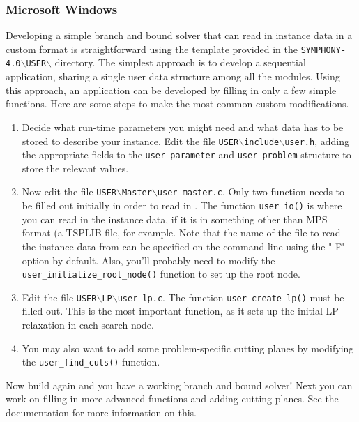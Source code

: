 \subsubsection{Microsoft Windows}
Developing a simple branch and bound solver that can read in instance data in
a custom format is straightforward using the template provided in the
\texttt{SYMPHONY-4.0$\backslash$USER$\backslash$} directory. The simplest approach is to develop a
sequential application, sharing a single user data structure among all the
modules. Using this approach, an application can be developed by filling in
only a few simple functions. Here are some steps to make the most common
custom modifications.

\begin{enumerate}

\item Decide what run-time parameters you might need and what data has 
to be stored to describe your instance. Edit the file
\texttt{USER$\backslash$include$\backslash$user.h}, adding the appropriate
fields to the \texttt{user\_parameter} and \texttt{user\_problem} structure to
store the relevant values.

\item Now edit the file
\texttt{USER$\backslash$Master$\backslash$user\_master.c}. Only two
function needs to be filled out initially in order to read in . The function
\texttt{user\_io()} is where you can read in the instance data, if it is in
something other than MPS format (a TSPLIB file, for example. Note that the
name of the file to read the instance data from can be specified on the
command line using the "-F" option by default. Also, you'll probably need to
modify the \texttt{user\_initialize\_root\_node()} function to set up the root
node. 

\item Edit the file \texttt{USER$\backslash$LP$\backslash$user\_lp.c}. The
function \texttt{user\_create\_lp()} must be filled out. This is the most
important function, as it sets up the initial LP relaxation in each search
node.

\item You may also want to add some problem-specific cutting planes by modifying
the \texttt{user\_find\_cuts()} function.

\end{enumerate}

Now build again and you have a working branch and bound solver! Next you can
work on filling in more advanced functions and adding cutting planes. See the
documentation for more information on this.

